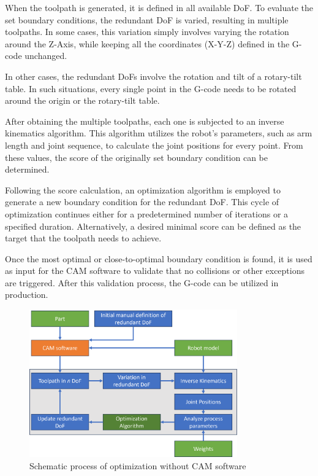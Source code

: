 When the toolpath is generated, it is defined in all available \acrshort{DoF}. To evaluate the set boundary conditions, the redundant \acrshort{DoF} is varied, resulting in multiple toolpaths. In some cases, this variation simply involves varying the rotation around the Z-Axis, while keeping all the coordinates (X-Y-Z) defined in the G-code unchanged.

In other cases, the redundant \acrshort{DoF}s involve the rotation and tilt of a rotary-tilt table. In such situations, every single point in the G-code needs to be rotated around the origin or the rotary-tilt table.

After obtaining the multiple toolpaths, each one is subjected to an inverse kinematics algorithm. This algorithm utilizes the robot's parameters, such as arm length and joint sequence, to calculate the joint positions for every point. From these values, the score of the originally set boundary condition can be determined.

Following the score calculation, an optimization algorithm is employed to generate a new boundary condition for the redundant \acrshort{DoF}. This cycle of optimization continues either for a predetermined number of iterations or a specified duration. Alternatively, a desired minimal score can be defined as the target that the toolpath needs to achieve.
 

Once the most optimal or close-to-optimal boundary condition is found, it is used as input for the \acrshort{CAM} software to validate that no collisions or other exceptions are triggered. After this validation process, the G-code can be utilized in production.

\begin{figure}[H]
	\centerline{\includegraphics[width=0.8\textwidth]{figures/noCAM.png}}
	\caption{Schematic process of optimization without CAM software}
	\label{noCAM}
\end{figure}

